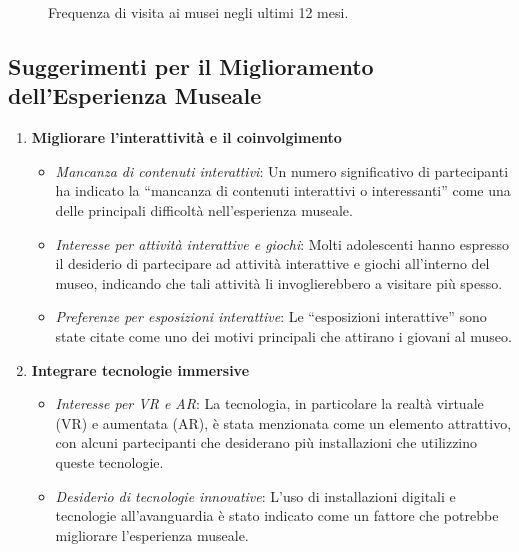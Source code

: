 \documentclass{article}
\begin{document}
\begin{figure}[h]
    \centering
    \caption{Frequenza di visita ai musei negli ultimi 12 mesi.}
\end{figure}
\newpage

\subsection{Suggerimenti per il Miglioramento dell'Esperienza Museale}

\begin{enumerate}
    \item \textbf{Migliorare l'interattività e il coinvolgimento}
        \begin{itemize}
            \item \textit{Mancanza di contenuti interattivi}: Un numero significativo di partecipanti ha indicato la ``mancanza di contenuti interattivi o interessanti'' come una delle principali difficoltà nell'esperienza museale.
            \item \textit{Interesse per attività interattive e giochi}: Molti adolescenti hanno espresso il desiderio di partecipare ad attività interattive e giochi all'interno del museo, indicando che tali attività li invoglierebbero a visitare più spesso.
            \item \textit{Preferenze per esposizioni interattive}: Le ``esposizioni interattive'' sono state citate come uno dei motivi principali che attirano i giovani al museo.
        \end{itemize}

    \item \textbf{Integrare tecnologie immersive}
        \begin{itemize}
            \item \textit{Interesse per VR e AR}: La tecnologia, in particolare la realtà virtuale (VR) e aumentata (AR), è stata menzionata come un elemento attrattivo, con alcuni partecipanti che desiderano più installazioni che utilizzino queste tecnologie.
            \item \textit{Desiderio di tecnologie innovative}: L'uso di installazioni digitali e tecnologie all'avanguardia è stato indicato come un fattore che potrebbe migliorare l'esperienza museale.
        \end{itemize}


\end{enumerate}
\end{document}
